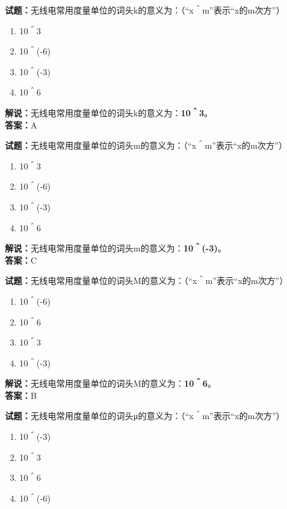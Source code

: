 \documentclass{ctexbook}
\begin{document}
\bigskip


\noindent\textbf{试题：}无线电常用度量单位的词头k的意义为：（“x＾m”表示“x的m次方”）

\begin{enumerate}[leftmargin=3em]
	\item 10＾3
	\item 10＾(-6)
	\item 10＾(-3)
	\item 10＾6
\end{enumerate}

\noindent\textbf{解说：}无线电常用度量单位的词头k的意义为：\textbf{10＾3}。\\\noindent\textbf{答案：}A


\bigskip


\noindent\textbf{试题：}无线电常用度量单位的词头m的意义为：（“x＾m”表示“x的m次方”）

\begin{enumerate}[leftmargin=3em]
	\item 10＾3
	\item 10＾(-6)
	\item 10＾(-3)
	\item 10＾6
\end{enumerate}

\noindent\textbf{解说：}无线电常用度量单位的词头m的意义为：\textbf{10＾(-3)}。\\\noindent\textbf{答案：}C


\bigskip


\noindent\textbf{试题：}无线电常用度量单位的词头M的意义为：（“x＾m”表示“x的m次方”）

\begin{enumerate}[leftmargin=3em]
	\item 10＾(-6)
	\item 10＾6
	\item 10＾3
	\item 10＾(-3)
\end{enumerate}

\noindent\textbf{解说：}无线电常用度量单位的词头M的意义为：\textbf{10＾6}。\\\noindent\textbf{答案：}B


\bigskip


\noindent\textbf{试题：}无线电常用度量单位的词头μ的意义为：（“x＾m”表示“x的m次方”）

\begin{enumerate}[leftmargin=3em]
	\item 10＾(-3)
	\item 10＾3
	\item 10＾6
	\item 10＾(-6)
\end{enumerate}
\end{document}

